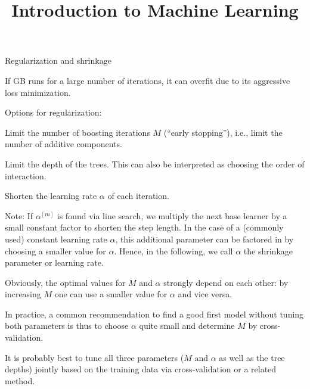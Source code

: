  






\newcommand{\titlefigure}{figure/gbm_sine_title}
\newcommand{\learninggoals}{
  \item Learn about three main regularization options: number of iterations, 
  tree depth and shrinkage
  \item Understand how regularization influences model fit
}

\title{Introduction to Machine Learning}
\date{}






\begin{vbframe}{Regularization and shrinkage}

If GB runs for a large number of iterations, it can overfit due to its aggressive loss
minimization.

\begin{blocki}{Options for regularization:}
\item Limit the number of boosting iterations $M$ (\enquote{early stopping}), i.e., limit the number of additive components.
\item Limit the depth of the trees. This can also be interpreted as choosing the order of interaction.
\item Shorten the learning rate $\alpha$ of each iteration.
\end{blocki}


Note: If $\alpha^{[m]}$ is found via line search, we multiply the next base learner by a small constant factor to shorten the step length.
In the case of a (commonly used) constant learning rate $\alpha$, this additional parameter 
can be factored in by choosing a smaller value for $\alpha$.
Hence, in the following, we call $\alpha$ the shrinkage parameter or learning rate.


\framebreak

Obviously, the optimal values for $M$ and $\alpha$ strongly depend on each other:
by increasing $M$ one can use a smaller value for $\alpha$ and vice versa.

\lz

In practice, a common recommendation to find a good first model without tuning both parameters is thus to choose $\alpha$ quite small and determine $M$ by cross-validation. 

\lz

It is probably best to tune all three parameters ($M$ and $\alpha$ as well as 
the tree depths) jointly based on the training data
via cross-validation or a related method.

\end{vbframe}

